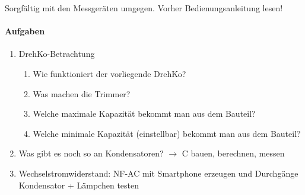Sorgfältig mit den Messgeräten umgegen. Vorher Bedienungsanleitung lesen!

\paragraph{Aufgaben}

\begin{enumerate}
    \item DrehKo-Betrachtung
    \begin{enumerate}
      \item Wie funktioniert der vorliegende DrehKo?
      \item Was machen die Trimmer?
      \item Welche maximale Kapazität bekommt man aus dem Bauteil?
      \item Welche minimale Kapazität (einstellbar) bekommt man aus dem Bauteil?
    \end{enumerate}
  \item Was gibt es noch so an Kondensatoren? $\rightarrow$ C bauen, berechnen, messen
  \item Wechselstromwiderstand: NF-AC mit Smartphone erzeugen und Durchgänge
    Kondensator + Lämpchen testen
\end{enumerate}
